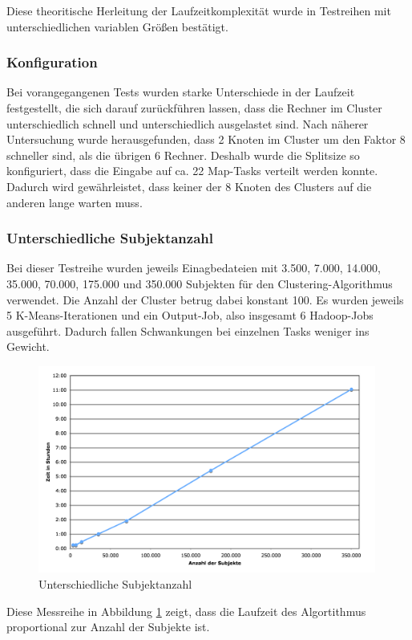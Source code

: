 \documentclass[a4paper]{llncs}
\begin{document}
Diese theoritische Herleitung der Laufzeitkomplexität wurde in Testreihen mit unterschiedlichen variablen Größen bestätigt.

\subsubsection{Konfiguration}
Bei vorangegangenen Tests wurden starke Unterschiede in der Laufzeit festgestellt, die sich darauf zurückführen lassen, dass die Rechner im Cluster unterschiedlich schnell und unterschiedlich ausgelastet sind. Nach näherer Untersuchung wurde herausgefunden, dass 2 Knoten im Cluster um den Faktor 8 schneller sind, als die übrigen 6 Rechner. Deshalb wurde die Splitsize so konfiguriert, dass die Eingabe auf ca. 22 Map-Tasks verteilt werden konnte. Dadurch wird gewährleistet, dass keiner der 8 Knoten des Clusters auf die anderen lange warten muss.

\subsubsection{Unterschiedliche Subjektanzahl}
Bei dieser Testreihe wurden jeweils Einagbedateien mit 3.500, 7.000, 14.000, 35.000, 70.000, 175.000 und 350.000 Subjekten für den Clustering-Algorithmus verwendet.
Die Anzahl der Cluster betrug dabei konstant 100.
Es wurden jeweils 5 K-Means-Iterationen und ein Output-Job, also insgesamt 6 Hadoop-Jobs ausgeführt. Dadurch fallen Schwankungen bei einzelnen Tasks weniger ins Gewicht.
\begin{figure}[!ht]
\centering
\includegraphics[width=0.99\textwidth]{charts/subjects.png}
\caption{Unterschiedliche Subjektanzahl}
\label{fig:subjects}
\end{figure}
Diese Messreihe in Abbildung \ref{fig:subjects} zeigt, dass die Laufzeit des Algortithmus proportional zur Anzahl der Subjekte ist.
\end{document}
